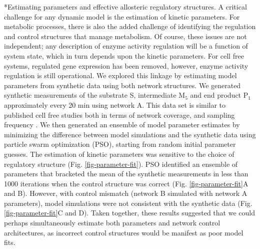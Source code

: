 \documentclass[12pt]{article}
\makeatletter
\renewcommand\subsection{\@startsection
	{subsection}{2}{0mm}
	{-0.05in}
	{-0.5\baselineskip}
	{\normalfont\normalsize\bfseries}}
\makeatother
\begin{document}
\subsection*{Estimating parameters and effective allosteric regulatory structures.}
A critical challenge for any dynamic model is the estimation of kinetic parameters. 
For metabolic processes, there is also the added challenge of identifying the regulation and control structures that manage metabolism. 
Of course, these issues are not independent; any description of enzyme activity regulation will be a function of system state, which in turn depends upon the kinetic parameters. 
For cell free systems, regulated gene expression has been removed, however, enzyme activity regulation is still operational. 
We explored this linkage by estimating model parameters from synthetic data using both network structures. 
We generated synthetic measurements of the substrate S, intermediate M$_{5}$ and end product P$_1$ approximately every 20 min using
network A. This data set is similar to published cell free studies both in terms of network coverage, and sampling frequency \citep{Jewett:2008aa}. 
We then generated an ensemble of model parameter estimates by minimizing the difference between model simulations and the synthetic data using particle swarm optimization (PSO), starting from random initial parameter guesses. The estimation of kinetic parameters was sensitive to the choice of regulatory structure (Fig. \ref{fig-parameter-fit}). 
PSO identified an ensemble of parameters that bracketed the mean of the synthetic measurements in less than 1000 iterations when the control structure was correct (Fig. \ref{fig-parameter-fit}A and B). 
However, with control mismatch (network B simulated with network A parameters), model simulations were not consistent with the synthetic data  (Fig. \ref{fig-parameter-fit}C and D). 
Taken together, these results suggested that we could perhaps simultaneously estimate both parameters and network control architectures, as incorrect control structures would be manifest as poor model fits.
\end{document}
